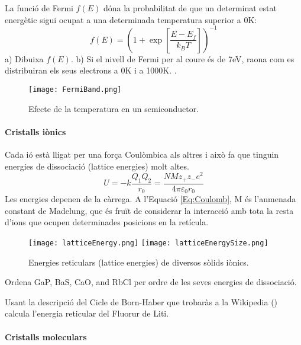 \begin{exr}
La funció de Fermi $f(E)$ dóna la probabilitat de que un determinat estat energètic sigui ocupat a una determinada temperatura superior a 0K:
\[f(E)=\left( 1 + \exp \left[ \frac{E-E_f}{k_B T} \right] \right)^{-1}\]
a) Dibuixa $f(E)$. b) Si el nivell de Fermi per al coure és de 7eV, raona com es distribuiran els seus electrons a 0K i a 1000K.
\label{Ex:Fermi}.
\end{exr}

\begin{figure}[h]
\centering
\texttt{[image: FermiBand.png]}
\caption{Efecte de la temperatura en un semiconductor.}
\label{fig:FermiBand}
\end{figure}

\paragraph{Cristalls iònics}
 Cada ió està lligat per una força Coulòmbica als altres i això fa que tinguin energies de dissociació (lattice energies) molt altes. 
\begin{equation}
U=-k\frac{Q_1 Q_2}{r_0} = \frac{NMz_+z_-e^2}{4\pi \varepsilon_0 r_0}
\label{Eq:Coulomb}
\end{equation}
Les energies depenen de la càrrega.
A l'Equació \ref{Eq:Coulomb}, M és l'anmenada constant de Madelung, que és fruït de considerar la interacció amb tota la resta d'ions que ocupen determinades posicions en la retícula.
\begin{figure}[h]
\centering
\texttt{[image: latticeEnergy.png]}
\texttt{[image: latticeEnergySize.png]}
\caption{Energies reticulars (lattice energies) de diversos sòlids iònics.}
\label{fig:latticeEnergy}
\end{figure}
\begin{exr}
Ordena GaP, BaS, CaO, and RbCl per ordre de les seves energies de dissociació.
\end{exr}

\begin{exr}
Usant la descripció del Cicle de Born-Haber que trobaràs a la Wikipedia () calcula l'energia reticular del Fluorur de Liti.
\end{exr}

\paragraph{Cristalls moleculars}

